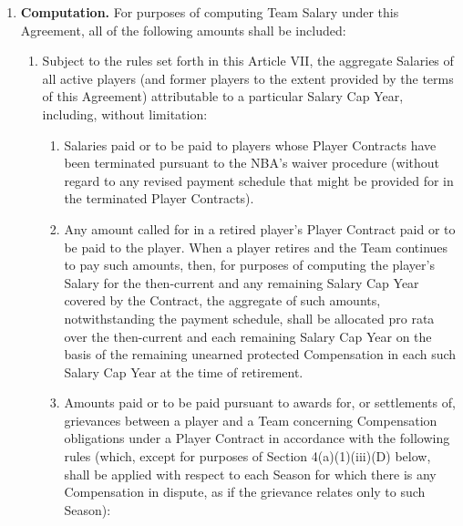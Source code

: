 \documentclass[
]{book}
\providecommand{\tightlist}{%
  \setlength{\itemsep}{0pt}\setlength{\parskip}{0pt}}
\begin{document}
\begin{enumerate}
\def\labelenumi{(\alph{enumi})}
\tightlist
\item
  \textbf{Computation.} For purposes of computing Team Salary under this Agreement, all of the following amounts shall be included:

  \begin{enumerate}
  \def\labelenumii{(\arabic{enumii})}
  \item
    Subject to the rules set forth in this Article VII, the aggregate Salaries of all active players (and former players to the extent provided by the terms of this Agreement) attributable to a particular Salary Cap Year, including, without limitation:

    \begin{enumerate}
    \def\labelenumiii{(\roman{enumiii})}
    \tightlist
    \item
      Salaries paid or to be paid to players whose Player Contracts have been terminated pursuant to the NBA's waiver procedure (without regard to any revised payment schedule that might be provided for in the terminated Player Contracts).
    \item
      Any amount called for in a retired player's Player Contract paid or to be paid to the player. When a player retires and the Team continues to pay such amounts, then, for purposes of computing the player's Salary for the then-current and any remaining Salary Cap Year covered by the Contract, the aggregate of such amounts, notwithstanding the payment schedule, shall be allocated pro rata over the then-current and each remaining Salary Cap Year on the basis of the remaining unearned protected Compensation in each such Salary Cap Year at the time of retirement.
    \item
      Amounts paid or to be paid pursuant to awards for, or settlements of, grievances between a player and a Team concerning Compensation obligations under a Player Contract in accordance with the following rules (which, except for purposes of Section 4(a)(1)(iii)(D) below, shall be applied with respect to each Season for which there is any Compensation in dispute, as if the grievance relates only to such Season):


\end{enumerate}
\end{enumerate}
\end{enumerate}
\end{document}
